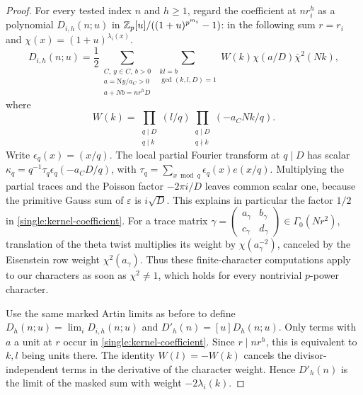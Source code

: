 \begin{proof}
For every tested index \(n\) and \(h\ge1\), regard the
coefficient at \(nr_i^h\) as a polynomial
\(D_{i,h}(n;u)\) in
\(\mathbb Z_p[u]/((1+u)^{p^{m_i}}-1)\): in the following sum
\(r=r_i\) and \(\chi(x)=(1+u)^{\lambda_i(x)}\).
\begin{equation}\label{single:kernel-coefficient}
 D_{i,h}(n;u)=\frac12
 \sum_{\substack{C,\ y\in C,\ b>0\\
       a=\mathrm Ny/a_C>0\\ a+Nb=nr^hD}}
 \sum_{\substack{kl=b\\\gcd(k,l,D)=1}}
 W(k)\chi(a/D)\bar\chi^2(Nk),
\end{equation}
where
\[
 W(k)=\prod_{\substack{q\mid D\\q\mid k}}(l/q)
            \prod_{\substack{q\mid D\\q\nmid k}}(-a_CNk/q).
\]
Write \(\epsilon_q(x)=(x/q)\).  The local partial Fourier
transform at \(q\mid D\) has scalar
\(\kappa_q=q^{-1}\tau_q\epsilon_q(-a_CD/q)\), with
\(\tau_q=\sum_{x\bmod q}\epsilon_q(x)e(x/q)\).
Multiplying the partial traces
and the Poisson factor \(-2\pi i/D\) leaves common scalar one,
because the primitive Gauss sum of \(\varepsilon\) is
\(i\sqrt D\).  This explains in particular the factor \(1/2\)
in \eqref{single:kernel-coefficient}.  For a trace matrix
\(\gamma=\left(\begin{smallmatrix}a_\gamma&b_\gamma\\
c_\gamma&d_\gamma\end{smallmatrix}\right)\in\Gamma_0(Nr^2)\),
translation of the theta twist multiplies its weight by
\(\chi(a_\gamma^{-2})\), canceled by the Eisenstein row
weight \(\chi^2(a_\gamma)\).  Thus these
finite-character computations apply to our characters as soon
as \(\chi^2\ne1\), which holds for every nontrivial
\(p\)-power character.

Use the same marked Artin limits as before to define
\(D_h(n;u)=\lim_i D_{i,h}(n;u)\) and
\(D'_h(n)=[u]D_h(n;u)\).  Only terms with \(a\) a unit at
\(r\) occur in \eqref{single:kernel-coefficient}.  Since
\(r\mid nr^h\), this is equivalent to \(k,l\) being units
there.  The identity \(W(l)=-W(k)\) cancels the
divisor-independent terms in the derivative of the character
weight.  Hence \(D'_h(n)\) is the limit of the masked sum
with weight \(-2\lambda_i(k)\).


\end{proof}
